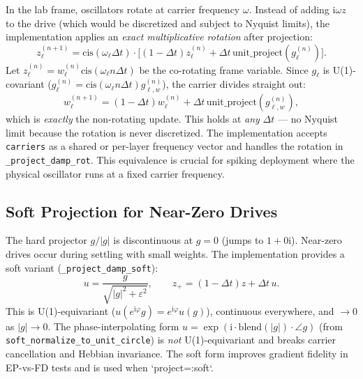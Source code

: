\documentclass[11pt]{article}
\newcommand{\im}{\mathrm{i}}
\newcommand{\dt}{\Delta t}
\newcommand{\unitproject}{\mathrm{unit\_project}}
\begin{document}
In the lab frame, oscillators rotate at carrier frequency $\omega$. Instead of adding $\im\omega z$ to the drive (which would be discretized and subject to Nyquist limits), the implementation applies an \emph{exact multiplicative rotation} after projection:
\begin{equation}
z_{\ell}^{(n+1)} = \mathrm{cis}(\omega_\ell \dt) \cdot \Big[ (1-\dt)z_\ell^{(n)} + \dt\, \unitproject(g_\ell^{(n)}) \Big].
\end{equation}
Let $z_\ell^{(n)} = w_\ell^{(n)} \mathrm{cis}(\omega_\ell n\dt)$ be the co-rotating frame variable. Since $g_\ell$ is U(1)-covariant ($g_\ell^{(n)} = \mathrm{cis}(\omega_\ell n\dt) g_{\ell,w}^{(n)}$), the carrier divides straight out:
\begin{equation}
w_\ell^{(n+1)} = (1-\dt)w_\ell^{(n)} + \dt\, \unitproject(g_{\ell,w}^{(n)}),
\end{equation}
which is \emph{exactly} the non-rotating update. This holds at \emph{any} $\dt$ — no Nyquist limit because the rotation is never discretized. The implementation accepts \texttt{carriers} as a shared or per-layer frequency vector and handles the rotation in \texttt{\_project\_damp\_rot}. This equivalence is crucial for spiking deployment where the physical oscillator runs at a fixed carrier frequency.

\subsection{Soft Projection for Near-Zero Drives}\label{ssec:soft-projection}

The hard projector $g/|g|$ is discontinuous at $g=0$ (jumps to $1+0\im$). Near-zero drives occur during settling with small weights. The implementation provides a soft variant (\texttt{\_project\_damp\_soft}):
\begin{equation}\label{eq:soft-project}
u = \frac{g}{\sqrt{|g|^2 + \varepsilon^2}}, \qquad
z_+ = (1-\dt)z + \dt\, u.
\end{equation}
This is U(1)-equivariant ($u(e^{\im\varphi}g) = e^{\im\varphi}u(g)$), continuous everywhere, and $\to 0$ as $|g|\to 0$. The phase-interpolating form $u = \exp(\im \cdot \mathrm{blend}(|g|) \cdot \angle g)$ (from \texttt{soft\_normalize\_to\_unit\_circle}) is \emph{not} U(1)-equivariant and breaks carrier cancellation and Hebbian invariance. The soft form improves gradient fidelity in EP-vs-FD tests and is used when `project=:soft`.
\end{document}
